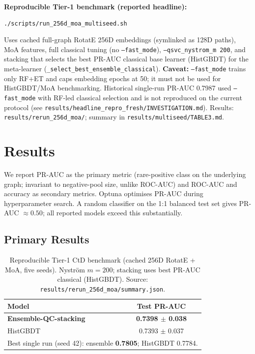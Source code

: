 \textbf{Reproducible Tier-1 benchmark (reported headline):}
{\small\begin{verbatim}
./scripts/run_256d_moa_multiseed.sh
\end{verbatim}}
Uses cached full-graph RotatE 256D embeddings (symlinked as 128D paths),
MoA features, full classical tuning (no \texttt{--fast\_mode}),
\texttt{--qsvc\_nystrom\_m 200}, and stacking that selects the best
PR-AUC classical base learner (HistGBDT) for the meta-learner
(\texttt{\_select\_best\_ensemble\_classical}).
\textbf{Caveat:} \texttt{--fast\_mode} trains only RF+ET and caps embedding
epochs at 50; it must not be used for HistGBDT/MoA benchmarking.
Historical single-run PR-AUC 0.7987 used \texttt{--fast\_mode} with
RF-led classical selection and is not reproduced on the current protocol
(see \texttt{results/headline\_repro\_fresh/INVESTIGATION.md}).
Results: \texttt{results/rerun\_256d\_moa/}; summary in
\texttt{results/multiseed/TABLE3.md}.

\section{Results}

We report PR-AUC as the primary metric (rare-positive class on the
underlying graph; invariant to negative-pool size, unlike ROC-AUC) and
ROC-AUC and accuracy as secondary metrics. Optuna optimises PR-AUC during
hyperparameter search. A random classifier on the 1:1 balanced test set
gives PR-AUC $\approx 0.50$; all reported models exceed this substantially.

\subsection{Primary Results}

\begin{table}[t]
\caption{Reproducible Tier-1 CtD benchmark (cached 256D RotatE + MoA, five seeds).
Nystr\"{o}m $m{=}200$; stacking uses best PR-AUC classical (HistGBDT).
Source: \texttt{results/rerun\_256d\_moa/summary.json}.}
\label{tab:primary}
\centering\small
\setlength{\tabcolsep}{3pt}
\begin{tabular}{@{}lc@{}}
\toprule
\textbf{Model} & \textbf{Test PR-AUC} \\
\midrule
\textbf{Ensemble-QC-stacking} & \textbf{0.7398 $\pm$ 0.038} \\
HistGBDT & 0.7393 $\pm$ 0.037 \\
\midrule
\multicolumn{2}{l}{\footnotesize Best single run (seed 42): ensemble \textbf{0.7805}; HistGBDT 0.7784.} \\
\bottomrule
\end{tabular}
\end{table}

